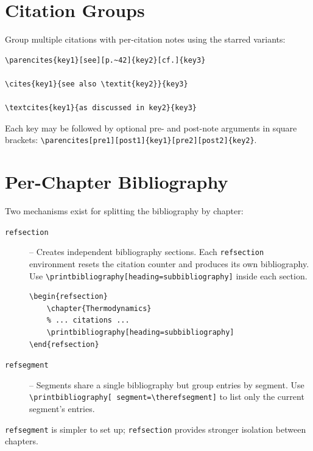 \section{Citation Groups}

Group multiple citations with per-citation notes using the starred variants:

\begin{verbatim}
\parencites{key1}[see][p.~42]{key2}[cf.]{key3}

\cites{key1}{see also \textit{key2}}{key3}

\textcites{key1}{as discussed in key2}{key3}
\end{verbatim}

Each key may be followed by optional pre- and post-note arguments in square
brackets: \verb|\parencites[pre1][post1]{key1}[pre2][post2]{key2}|.

\section{Per-Chapter Bibliography}

Two mechanisms exist for splitting the bibliography by chapter:

\begin{description}
    \item[{\texttt{refsection}}] -- Creates independent bibliography
        sections. Each \texttt{refsection} environment resets the citation
        counter and produces its own bibliography. Use
        \verb|\printbibliography[heading=subbibliography]| inside each
        section.

\begin{verbatim}
\begin{refsection}
    \chapter{Thermodynamics}
    % ... citations ...
    \printbibliography[heading=subbibliography]
\end{refsection}
\end{verbatim}

    \item[{\texttt{refsegment}}] -- Segments share a single bibliography but
        group entries by segment. Use \texttt{\textbackslash printbibliography[%
        segment=\textbackslash therefsegment]} to list only the current
        segment's entries.
\end{description}

\texttt{refsegment} is simpler to set up; \texttt{refsection} provides
stronger isolation between chapters.

